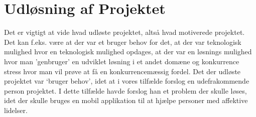 \section{Udløsning af Projektet}
Det er vigtigt at vide hvad udløste projektet, altså hvad motiverede projektet. 
Det kan f.eks. være at der var et bruger behov for det, at der var teknologisk mulighed hvor en teknologisk mulighed opdages, at der var en løsnings mulighed hvor man 'genbruger' en udviklet løsning i et andet domæne og konkurrence stress hvor man vil prøve at få en konkurrencemæssig fordel. 
Det der udløste projektet var `bruger behov', idet at i vores tilfælde forslog en udefrakommende person projektet.
I dette tilfælde havde forslog han et problem der skulle løses, idet der skulle bruges en mobil applikation til at hjælpe personer med affektive lidelser. 
